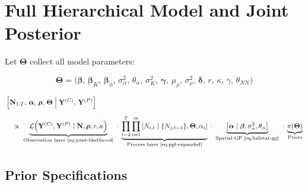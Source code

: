 \documentclass[12pt,a4paper]{article}
\theoremstyle{definition}
\newcommand{\bbeta}{\bm{\beta}}
\newcommand{\balpha}{\bm{\alpha}}
\newcommand{\bTheta}{\bm{\Theta}}
\newcommand{\bgamma}{\bm{\gamma}}
\newcommand{\bdelta}{\bm{\delta}}
\begin{document}
\section{Full Hierarchical Model and Joint Posterior}
\label{sec:posterior}

Let $\bTheta$ collect all model parameters:

\begin{equation}
  \bTheta =
  \bigl(\bbeta,\, \bbeta_K,\, \bbeta_\phi,\,
        \sigma_\alpha^2,\, \theta_\alpha,\, \sigma_K^2,\,
        \bgamma,\, \mu_\rho,\, \sigma_\rho^2,\,
        \bdelta,\, r,\, \kappa,\, \gamma,\, \theta_{NN}\bigr)
  \label{eq:theta}
\end{equation}

\begin{keybox}
\begin{align}
  &\left[\mathbf{N}_{1:T},\, \balpha,\, \boldsymbol{\rho},\, \bTheta
    \;\Big|\; \mathbf{Y}^{(C)},\, \mathbf{Y}^{(P)}\right]
  \notag\\[6pt]
  &\quad\propto\;
  \underbrace{
    \mathcal{L}\!\left(\mathbf{Y}^{(C)}, \mathbf{Y}^{(P)}
      \mid \mathbf{N}, \boldsymbol{\rho}, r, \kappa\right)
  }_{\text{Observation layer \eqref{eq:joint-likelihood}}}
  \;\cdot\;
  \underbrace{
    \prod_{t=2}^{T}\prod_{i=1}^{m}
    \left[N_{i,t} \mid \{N_{j,t-1}\}, \bTheta, \alpha_i\right]
  }_{\text{Process layer \eqref{eq:pgf-expanded}}}
  \;\cdot\;
  \underbrace{
    \left[\balpha \mid \bbeta, \sigma_\alpha^2, \theta_\alpha\right]
  }_{\text{Spatial GP \eqref{eq:habitat-gp}}}
  \;\cdot\;
  \underbrace{
    \pi(\bTheta)
  }_{\text{Priors}}
  \label{eq:posterior}
\end{align}
\end{keybox}

\subsection{Prior Specifications}
\end{document}
